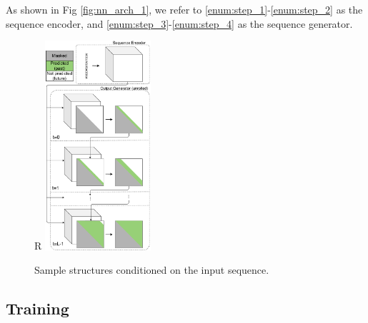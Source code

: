 \documentclass{article}
\begin{document}
As shown in Fig \ref{fig:nn_arch_1}, we refer to \ref{enum:step_1}-\ref{enum:step_2} as the sequence encoder,
and \ref{enum:step_3}-\ref{enum:step_4} as the sequence generator.



%


\begin{figure}{R}
        \centering
        \includegraphics[width=0.35\textwidth]{plot/nn_arch_2.pdf}
        \caption{Sample structures conditioned on the input sequence.}
        \vspace{-3em}
        \label{fig:nn_arch_2}
        \centering
\end{figure}




\subsection{Training}
\end{document}

